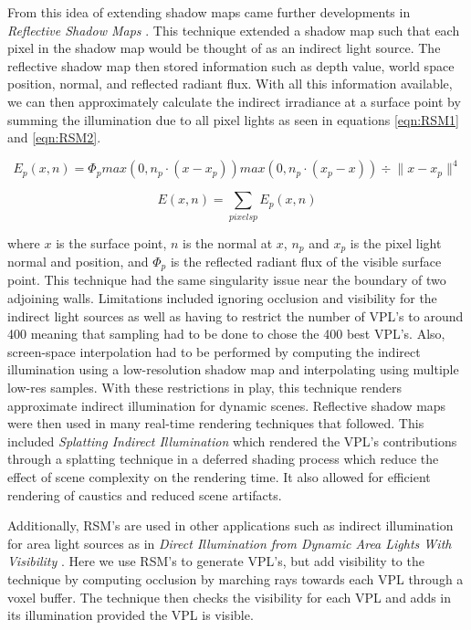 From this idea of extending shadow maps came further developments in \textit{Reflective Shadow Maps} \cite{Dachsbacher2005}.  This technique extended a shadow map such that each pixel in the shadow map would be thought of as an indirect light source.  The reflective shadow map then stored information such as depth value, world space position, normal, and reflected radiant flux.  With all this information available, we can then approximately calculate the indirect irradiance at a surface point by summing the illumination due to all pixel lights as seen in equations \ref{eqn:RSM1} and \ref{eqn:RSM2}.

\begin{equation}
E_{p} (x,n) = \Phi_{p} {max(0, n_{p} \cdot (x-x_{p})) max(0, n_{p} \cdot (x_{p} - x))  } \div {\| x-x_{p} \|^{4} } \label{eqn:RSM1}
\end{equation}

\begin{equation}
E(x,n) = \sum_{pixels p} E_{p}(x,n) \label{eqn:RSM2}
\end{equation}

where $x$ is the surface point, $n$ is the normal at $x$, $n_{p}$ and $x_{p}$ is the pixel light normal and position, and $\Phi_{p}$ is the reflected radiant flux of the visible surface point.  This technique had the same singularity issue near the boundary of two adjoining walls.  Limitations included ignoring occlusion and visibility for the indirect light sources as well as having to restrict the number of VPL's to around 400 meaning that sampling had to be done to chose the 400 best VPL's.  Also, screen-space interpolation had to be performed by computing the indirect illumination using a low-resolution shadow map and interpolating using multiple low-res samples.  With these restrictions in play, this technique renders approximate indirect illumination for dynamic scenes.  Reflective shadow maps were then used in many real-time rendering techniques that followed.  This included \textit{Splatting Indirect Illumination} \cite{Dachsbacher2006} which rendered the VPL's contributions through a splatting technique in a deferred shading process which reduce the effect of scene complexity on the rendering time.  It also allowed for efficient rendering of caustics and reduced scene artifacts.  

Additionally, RSM's are used in other applications such as indirect illumination for area light sources as in \textit{Direct Illumination from Dynamic Area Lights With Visibility} \cite{Nichols2010}.  Here we use RSM's to generate VPL's, but add visibility to the technique by computing occlusion by marching rays towards each VPL through a voxel buffer.  The technique then checks the visibility for each VPL and adds in its illumination provided the VPL is visible.

